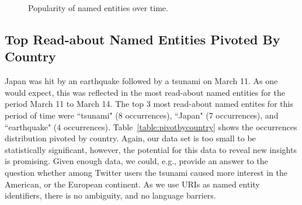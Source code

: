 \documentclass[runningheads,a4paper]{llncs}
\begin{document}
\begin{figure}[ht!]
  \begin{center}
  \end{center}
  \caption{Popularity of named entities over time.}
  \label{fig:overtime}
\end{figure}

\subsection{Top Read-about Named Entities Pivoted By Country}
Japan was hit by an earthquake followed by a tsunami on March 11. As one would expect, this was reflected in the most read-about named entities for the period March 11 to March 14. The top 3 most read-about named entites for this period of time were ``tsunami" (8 occurrences), ``Japan" (7 occurrences), and ``earthquake" (4 occurrences). Table~\ref{table:pivotbycountry} shows the occurrences distribution pivoted by country. Again, our data set is too small to be statistically significant, however, the potential for this data to reveal new insights is promising. Given enough data, we could, e.g., provide an answer to the question whether among Twitter users the tsunami caused more interest in the American, or the European continent. As we use URIs as named entity identifiers, there is no ambiguity, and no language barriers. 
\end{document}
